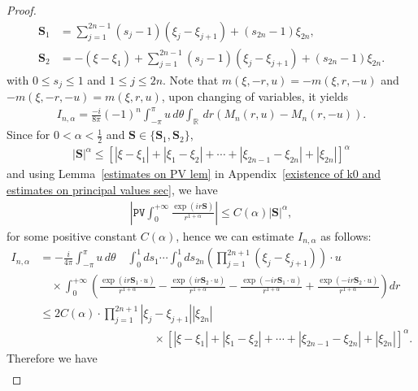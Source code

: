 \documentclass[reqno]{amsart}%
\theoremstyle{definition}
\theoremstyle{remark}
\numberwithin{equation}{section}
\newcommand{\0}{\mathbf{0}}
\newcommand{\1}{\mathbf{1}}
\newcommand{\R}{\mathbb R}
\newcommand{\PV}{\texttt{PV}}
\numberwithin{equation}{section}
\numberwithin{theorem}{section}
\numberwithin{figure}{section}
\begin{document}
{\begin{proof}
\begin{align*}
\mathbf{S}_1 &= \sum_{j=1}^{2n-1} (s_{j} - 1) (\xi_{j} - \xi_{j+1}) + (s_{2n}-1) \xi_{2n},\\
\mathbf{S}_2 &= - (\xi - \xi_{1}) + \sum_{j=1}^{2n-1} (s_{j} - 1) (\xi_{j} - \xi_{j+1}) + (s_{2n}-1) \xi_{2n}.
\end{align*}
with $0 \leq s_j \leq 1$ and $ 1 \leq j \leq 2n$. Note that $m(\xi,-r,u)=-m(\xi,r,-u)$ and $-m(\xi,-r,-u)=m(\xi,r,u)$, upon changing of variables, it yields
\begin{align*}
I_{n,\alpha}=   \frac{-i}{8\pi} (-1)^{n} \int_{-\pi}^{\pi} u \, d\theta \int_{\R}  \, dr \left( M_{n}(r, u) - M_{n}(r, -u) \right).
\end{align*}
Since for $0 < \alpha < \frac{1}{2}$ and $\mathbf{S}\in\{\mathbf{S}_1, \mathbf{S}_2\}$,
\begin{align*}
|\mathbf{S}|^{\alpha} \leq \left[ \left| \xi - \xi_1 \right| + \left|\xi_1 - \xi_2\right| + \cdots + \left| \xi_{2n-1} - \xi_{2n} \right| +\left|\xi_{2n} \right| \right]^\alpha 
\end{align*}
and using Lemma~\ref{estimates on PV lem} in Appendix~\ref{existence of k0 and estimates on principal values sec}, we have
\begin{align*}
 \left|\PV\int_{0}^{+\infty}\frac{\exp(i r \mathbf{S})}{r^{1+\alpha}} \right|\leq C(\alpha)|\mathbf{S}|^{\alpha},
\end{align*}
for some positive constant $C(\alpha)$, hence we can estimate $I_{n,\alpha}$ as follows:
\begin{align*}
I_{n,\alpha} &= - \frac{i}{4 \pi} \int_{-\pi}^{\pi} u \, d\theta \quad \int_{0}^{1} ds_{1} \cdots \int_{0}^{1} ds_{2n} \left( \prod_{j=1}^{2n+1} (\xi_{j} - \xi_{j+1}) \right) \cdot u \\
&\quad \times \int_{0}^{+\infty} \left( \frac{ \exp(i r \mathbf{S}_1 \cdot u) }{ r^{1+\alpha} } - \frac{ \exp(i r \mathbf{S}_2 \cdot u) }{ r^{1+\alpha} } - \frac{ \exp(-i r \mathbf{S}_1 \cdot u) }{ r^{1+\alpha} } + \frac{ \exp(-i r \mathbf{S}_2 \cdot u) }{ r^{1+\alpha} } \right) dr\\
&\le2C(\alpha) \cdot \prod_{j=1}^{2n+1} \left| \xi_{j} - \xi_{j+1} \right| \left| \xi_{2n} \right| \\
&\qquad\qquad\qquad\qquad\qquad\times \left[ \left| \xi - \xi_1 \right| + \left|\xi_1 - \xi_2\right| + \cdots + \left| \xi_{2n-1} - \xi_{2n} \right| +\left|\xi_{2n} \right| \right]^\alpha.
\end{align*}
Therefore we have
\begin{equation}\nonumber
\begin{aligned}

\end{aligned}
\end{equation}
\end{proof}}
\end{document}
